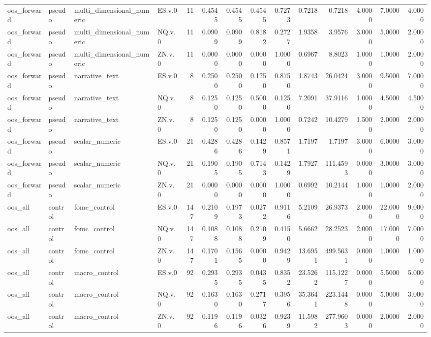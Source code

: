 \begin{tabular}{llllrrrrrrrrrr}
oos_forward & pseudo & multi_dimensional_numeric & ES.v.0 & 11 & 0.4545 & 0.4545 & 0.4545 & 0.7273 & 0.7218 & 0.7218 & 4.0000 & 7.0000 & 4.0000 \\
oos_forward & pseudo & multi_dimensional_numeric & NQ.v.0 & 11 & 0.0909 & 0.0909 & 0.8182 & 0.2727 & 1.9358 & 3.9576 & 3.0000 & 5.0000 & 2.0000 \\
oos_forward & pseudo & multi_dimensional_numeric & ZN.v.0 & 11 & 0.0000 & 0.0000 & 0.0000 & 1.0000 & 0.6967 & 8.8023 & 1.0000 & 1.0000 & 2.0000 \\
oos_forward & pseudo & narrative_text & ES.v.0 & 8 & 0.2500 & 0.2500 & 0.1250 & 0.8750 & 1.8743 & 26.0424 & 3.0000 & 9.5000 & 7.0000 \\
oos_forward & pseudo & narrative_text & NQ.v.0 & 8 & 0.1250 & 0.1250 & 0.5000 & 0.1250 & 7.2091 & 37.9116 & 1.0000 & 4.5000 & 4.5000 \\
oos_forward & pseudo & narrative_text & ZN.v.0 & 8 & 0.1250 & 0.1250 & 0.0000 & 1.0000 & 0.7242 & 10.4279 & 1.5000 & 2.0000 & 2.0000 \\
oos_forward & pseudo & scalar_numeric & ES.v.0 & 21 & 0.4286 & 0.4286 & 0.1429 & 0.8571 & 1.7197 & 1.7197 & 3.0000 & 6.0000 & 3.0000 \\
oos_forward & pseudo & scalar_numeric & NQ.v.0 & 21 & 0.1905 & 0.1905 & 0.7143 & 0.1429 & 1.7927 & 111.4593 & 0.0000 & 3.0000 & 3.0000 \\
oos_forward & pseudo & scalar_numeric & ZN.v.0 & 21 & 0.0000 & 0.0000 & 0.0000 & 1.0000 & 0.6992 & 10.2144 & 1.0000 & 1.0000 & 2.0000 \\
oos_all & control & fomc_control & ES.v.0 & 147 & 0.2109 & 0.1973 & 0.0272 & 0.9116 & 5.2109 & 26.9373 & 2.0000 & 22.0000 & 9.0000 \\
oos_all & control & fomc_control & NQ.v.0 & 147 & 0.1088 & 0.1088 & 0.2109 & 0.4150 & 5.6662 & 28.2523 & 2.0000 & 17.0000 & 7.0000 \\
oos_all & control & fomc_control & ZN.v.0 & 147 & 0.1701 & 0.1565 & 0.0000 & 0.9429 & 13.6951 & 499.5631 & 0.0000 & 1.0000 & 1.0000 \\
oos_all & control & macro_control & ES.v.0 & 92 & 0.2935 & 0.2935 & 0.0435 & 0.8352 & 23.5262 & 115.1227 & 0.0000 & 5.5000 & 5.0000 \\
oos_all & control & macro_control & NQ.v.0 & 92 & 0.1630 & 0.1630 & 0.2717 & 0.3956 & 35.3641 & 223.1448 & 0.0000 & 5.0000 & 3.0000 \\
oos_all & control & macro_control & ZN.v.0 & 92 & 0.1196 & 0.1196 & 0.0326 & 0.9239 & 11.5982 & 277.9603 & 0.0000 & 2.0000 & 2.0000 \\

\end{tabular}

